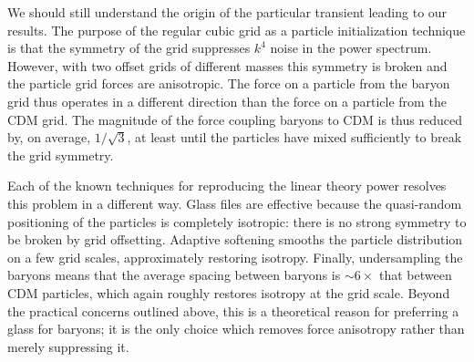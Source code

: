 \documentclass[a4paper,11pt]{article}
\newcommand{\YF}[1]{\textcolor{green}{[\bf YF: #1]} }
\begin{document}
We should still understand the origin of the particular transient leading to our results. The purpose of the regular cubic grid as a particle initialization technique is that the symmetry of the grid suppresses $k^4$ noise in the power spectrum. However, with two offset grids of different masses this symmetry is broken and the particle grid forces are anisotropic. The force on a particle from the baryon grid thus operates in a different direction than the force on a particle from the CDM grid. The magnitude of the force coupling baryons to CDM is thus reduced by, on average, $1/\sqrt{3}$, at least until the particles have mixed sufficiently to break the grid symmetry.

Each of the known techniques for reproducing the linear theory power resolves this problem in a different way. Glass files are effective because the quasi-random positioning of the particles is completely isotropic: there is no strong symmetry to be broken by grid offsetting. Adaptive softening smooths the particle distribution on a few grid scales, approximately restoring isotropy. Finally, undersampling the baryons means that the average spacing between baryons is $\sim 6\times$ that between CDM particles, which again roughly restores isotropy at the grid scale. Beyond the practical concerns outlined above, this is a theoretical reason for preferring a glass for baryons; it is the only choice which removes force anisotropy rather than merely suppressing it.



\end{document}
